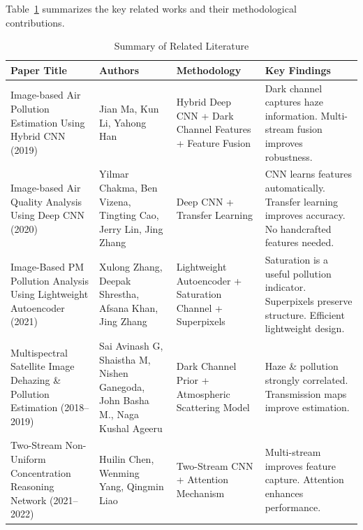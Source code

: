 \documentclass[conference]{IEEEtran}
\begin{document}
Table~\ref{tab:litreview} summarizes the key related works and their
methodological contributions.

\begin{table}[t]
  \centering
  \caption{Summary of Related Literature}
  \label{tab:litreview}
  \renewcommand{\arraystretch}{1.3}
  \begin{tabular}{>{\raggedright}p{3.8cm}
                  >{\raggedright}p{3.2cm}
                  >{\raggedright}p{4.0cm}
                  >{\raggedright\arraybackslash}p{4.0cm}}
    \toprule
    \textbf{Paper Title} & \textbf{Authors} & \textbf{Methodology} & \textbf{Key Findings} \\
    \midrule
    Image-based Air Pollution Estimation Using Hybrid CNN (2019)
      & Jian Ma, Kun Li, Yahong Han
      & Hybrid Deep CNN + Dark Channel Features + Feature Fusion
      & Dark channel captures haze information. Multi-stream fusion improves robustness. \\
    \midrule
    Image-based Air Quality Analysis Using Deep CNN (2020)
      & Yilmar Chakma, Ben Vizena, Tingting Cao, Jerry Lin, Jing Zhang
      & Deep CNN + Transfer Learning
      & CNN learns features automatically. Transfer learning improves accuracy. No handcrafted features needed. \\
    \midrule
    Image-Based PM Pollution Analysis Using Lightweight Autoencoder (2021)
      & Xulong Zhang, Deepak Shrestha, Afsana Khan, Jing Zhang
      & Lightweight Autoencoder + Saturation Channel + Superpixels
      & Saturation is a useful pollution indicator. Superpixels preserve structure. Efficient lightweight design. \\
    \midrule
    Multispectral Satellite Image Dehazing \& Pollution Estimation (2018--2019)
      & Sai Avinash G, Shaistha M, Nishen Ganegoda, John Basha M., Naga Kushal Ageeru
      & Dark Channel Prior + Atmospheric Scattering Model
      & Haze \& pollution strongly correlated. Transmission maps improve estimation. \\
    \midrule
    Two-Stream Non-Uniform Concentration Reasoning Network (2021--2022)
      & Huilin Chen, Wenming Yang, Qingmin Liao
      & Two-Stream CNN + Attention Mechanism
      & Multi-stream improves feature capture. Attention enhances performance. \\
    \bottomrule
  \end{tabular}
\end{table}

\end{document}
